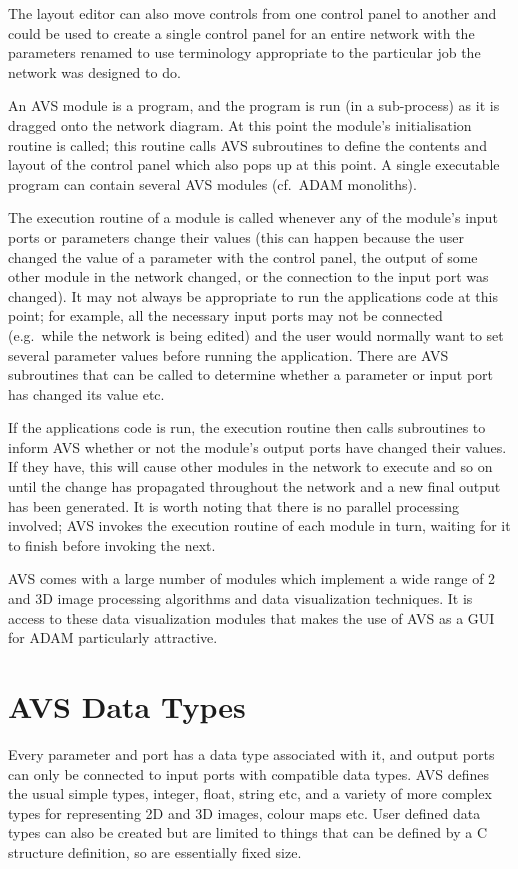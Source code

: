 The layout editor can also move controls from one control panel to another and
could be used to create a single control panel  for an entire network with the
parameters renamed to use terminology appropriate to the particular job the
network was designed to do.

An AVS module is a program, and the program is run (in a sub-process) as it is
dragged onto the network diagram. At this point the module's initialisation
routine is called; this routine calls AVS subroutines to define the contents
and layout of the control panel which also pops up at this point. A single
executable program can contain several AVS modules (cf.\ ADAM monoliths).

The execution routine of a module is called whenever any of the module's input
ports or parameters change their values (this can happen because the user
changed the value of a parameter with the control panel, the output of some
other module in the network changed, or the connection to the input port was
changed). It may not always be appropriate to run the applications code at this
point; for example, all the necessary input ports may not be connected (e.g.\
while the network is being edited) and the user would normally want to set
several parameter values before running the application. There are AVS
subroutines that can be called to determine whether a parameter or input port
has changed its value etc.

If the applications code is run, the execution routine then calls subroutines
to inform AVS whether or not the module's output ports have changed their
values. If they have, this  will cause other modules in the network to execute
and so on until the change  has propagated throughout the network and a new
final output has been  generated. It is worth noting that there is no parallel
processing involved;  AVS invokes the execution routine of each module in turn,
waiting for it to  finish before invoking the next.

AVS comes with a large number of modules which implement a wide range of 2 and
3D image processing algorithms and data visualization techniques. It is access
to these data visualization modules that makes the use of AVS as a GUI for ADAM 
particularly attractive.

\section{AVS Data Types}

Every parameter and port has a data type associated with it, and output ports
can only be connected to input ports with compatible data types. AVS defines
the usual simple types, integer, float, string etc, and a variety of more
complex types for representing 2D and 3D images, colour maps etc. User defined
data types can also be created but are limited to things that can be defined by
a C structure definition, so are essentially fixed size.

